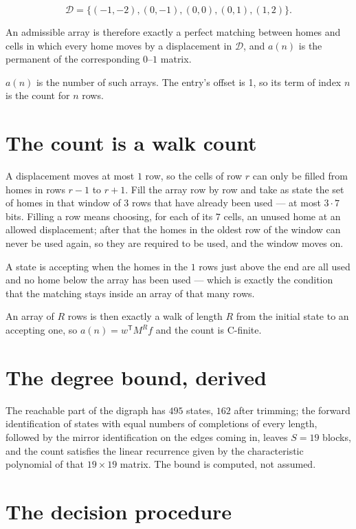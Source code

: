 \documentclass[11pt]{article}
\theoremstyle{definition}
\begin{document}
\[\mathcal{D} = \{(-1,-2), (0,-1), (0,0), (0,1), (1,2)\}.\]

An admissible array is therefore exactly a perfect matching between homes and cells in which every home moves by a displacement in $\mathcal{D}$, and $a(n)$ is the permanent of the corresponding $0$--$1$ matrix.

$a(n)$ is the number of such arrays. The entry's offset is 1, so its term of index $n$ is the count for $n$ rows.

\section{The count is a walk count}

A displacement moves at most $1$ row, so the cells of row $r$ can only be filled from homes in rows $r-1$ to $r+1$. Fill the array row by row and take as state the set of homes in that window of $3$ rows that have already been used --- at most $3\cdot7$ bits. Filling a row means choosing, for each of its $7$ cells, an unused home at an allowed displacement; after that the homes in the oldest row of the window can never be used again, so they are required to be used, and the window moves on.

A state is accepting when the homes in the $1$ rows just above the end are all used and no home below the array has been used --- which is exactly the condition that the matching stays inside an array of that many rows.

An array of $R$ rows is then exactly a walk of length $R$ from the initial state to an accepting one, so $a(n) = w^{\mathsf T}M^{R}f$ and the count is C-finite.

\section{The degree bound, derived}

The reachable part of the digraph has $495$ states, $162$ after trimming; the forward identification of states with equal numbers of completions of every length, followed by the mirror identification on the edges coming in, leaves $S = 19$ blocks, and the count satisfies the linear recurrence given by the characteristic polynomial of that $19\times19$ matrix. The bound is computed, not assumed.

\section{The decision procedure}
\end{document}
